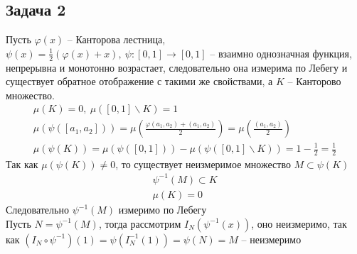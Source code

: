 \subsection*{Задача 2}
	Пусть $\varphi(x)$ -- Канторова лестница, $\psi(x) = \frac{1}{2} (\varphi(x) + x),\ \psi:[0,1] \to [0,1]$ -- взаимно однозначная функция, непрерывна и монотонно возрастает, следовательно она измерима по Лебегу и существует обратное отображение с такими же свойствами, а $K$ -- Канторово множество.
	\begin{gather*}
		\mu(K) = 0,\ \mu([0,1]\backslash K) = 1\\
		\mu(\psi([a_1,a_2])) = \mu \left(\frac{\varphi(a_1,a_2) + (a_1,a_2)}{2}\right) = \mu \left(\frac{(a_1,a_2)}{2}\right)\\
		\mu(\psi(K)) = \mu(\psi([0,1])) - \mu(\psi([0,1]\backslash K)) = 1 - \frac{1}{2} = \frac{1}{2}
	\end{gather*}
	Так как $\mu(\psi(K)) \ne 0$, то существует неизмеримое множество $M \subset \psi(K)$
	\begin{gather*}
		\psi^{-1}(M) \subset K\\
		\mu(K) = 0
	\end{gather*}
	Следовательно $\psi^{-1}(M)$ измеримо по Лебегу\\
	Пусть $N = \psi^{-1}(M)$, тогда рассмотрим $I_N (\psi^{-1}(x))$, оно неизмеримо, так как $(I_N \circ \psi^{-1})(1) = \psi(I_N^{-1}(1)) = \psi(N) = M$ -- неизмеримо
	\vskip0.5in
\begin{comment}
	Пусть $f: [0,1] \to [0,1]$ -- Канторова лестница. На канторовом множестве $K$: $f(x) = \sup\limits_{\substack{y < x \\ y \notin K}} f(y)$, если $x \in K$. Тогда $f$ непрерывная.\\
	Пусть $g(x) = f(x) + x$, $g: [0,1] \to [0,2]$, $g$ непрерывна и монотонно возрастает.
	\begin{gather*}
	\mu(g(K)) = 1\\
	\mu(g(a_ia_j)) = l(a_i,a_j)\qquad a_i a_j\text{ -- некий отрезок, } l(a_i, a_j) \text{ -- его длина}\\
	\mu(g([0,1] \backslash K)) = \sum\limits_{i,j} \mu(g(a_i a_j)) = \sum\limits_{i,j} \mu(a_i a_j) = \mu(\sum a_i a_j) = \mu([0,1] \backslash K) = 1
	\end{gather*}
	Получается, что $\mu(g(K)) = \mu(g[0,1]) - \mu(g([0,1] \backslash K)) = 2 - 1 = 1$, тогда существует неизмеримое $M \subset g(K)$, так как в любом множестве ненулевой меры существует неизмеримое подмножество.\\
	$N = g^{-1}(M)$, рассмотрим композицию $I_N \circ g^{-1}$. Заметим, что $g^{-1}$ измерима, так как непрерывна.\\
	$N \subset K$, следовательно $\mu(N) = 0$, следовательно $I_N$ измерима.\\
	$I_N \circ g^{-1}$ неизмерима, так как $(I_n \circ g^{-1})^{-1} (1) = (g \circ I_n^{-1})(1) = g(N) = M$ -- неизмерима, а $\{1\}$ -- борелевское множество, а для любого борелевского множества прообраз должен быть измерим, если функция измерима
\end{comment}
	
